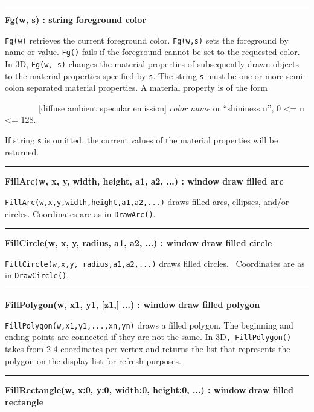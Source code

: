 \bigskip\hrule\vspace{0.1cm}
\noindent
{\bf Fg(w, s) : string } \hfill {\bf foreground color}

\noindent
\texttt{Fg(w)} retrieves the current foreground color. \texttt{Fg(w,s)}
sets the foreground by name or value. \texttt{Fg()} fails if the
foreground cannot be set to the requested color. In 3D,
\texttt{Fg(w, s)} changes the material properties of subsequently drawn objects
to the material properties specified by \texttt{s}. The string \texttt{s}
must be one or more semi-colon separated material properties. A
material property is of the form 

\ \ \ \ \ \ \ \ [diffuse {\textbar} ambient {\textbar} specular
{\textbar} emission] \textit{color name} or
{\textquotedblleft}shininess n{\textquotedblright}, 0 {\textless}= n
{\textless}= 128.

If string \texttt{s} is omitted, the current values of the material
properties will be returned.

\bigskip\hrule\vspace{0.1cm}
\noindent
{\bf FillArc(w, x, y, width, height, a1, a2, ...) : window } \hfill {\bf draw filled arc}

\noindent
\texttt{FillArc(w,x,y,width,height,a1,a2,...)} draws filled arcs,
ellipses, and/or circles. Coordinates are as in \texttt{DrawArc()}.

\bigskip\hrule\vspace{0.1cm}
\noindent
{\bf FillCircle(w, x, y, radius, a1, a2, ...) : window } \hfill {\bf draw filled circle}

\noindent
\texttt{FillCircle(w,x,y, radius,a1,a2,...)} draws filled circles.
\ Coordinates are as in \texttt{DrawCircle()}.

\bigskip\hrule\vspace{0.1cm}
\noindent
{\bf FillPolygon(w, x1, y1, [z1,] ...) : window } \hfill {\bf draw filled polygon}

\noindent
\texttt{FillPolygon(w,x1,y1,...,xn,yn)} draws a filled polygon. The
beginning and ending points are connected if they are not the same. In
3D\texttt{, FillPolygon()} takes from 2-4 coordinates per vertex and
returns the list that represents the polygon on the display list for
refresh purposes. 

\bigskip\hrule\vspace{0.1cm}
\noindent
{\bf FillRectangle(w, x:0, y:0, width:0, height:0, ...) : window } \hfill {\bf draw filled rectangle}

